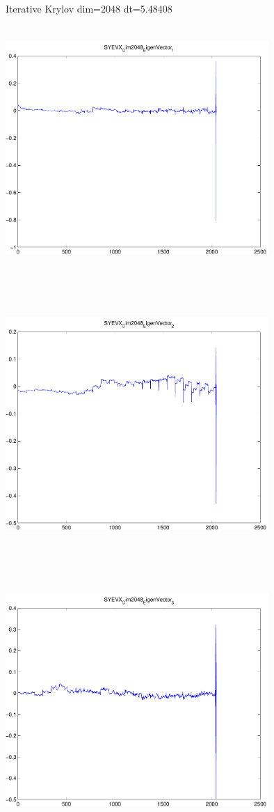 \documentclass[9pt]{article}
\theoremstyle{plain}
\theoremstyle{definition}
\theoremstyle{remark}
\numberwithin{equation}{section}
\begin{document}
Iterative Krylov dim=2048 dt=5.48408
\includegraphics[width=10.0cm,height=10.0cm]{SYEVX_Dim2048_EigenVector_1.pdf}

\includegraphics[width=10.0cm,height=10.0cm]{SYEVX_Dim2048_EigenVector_2.pdf}

\includegraphics[width=10.0cm,height=10.0cm]{SYEVX_Dim2048_EigenVector_3.pdf}
\end{document}
